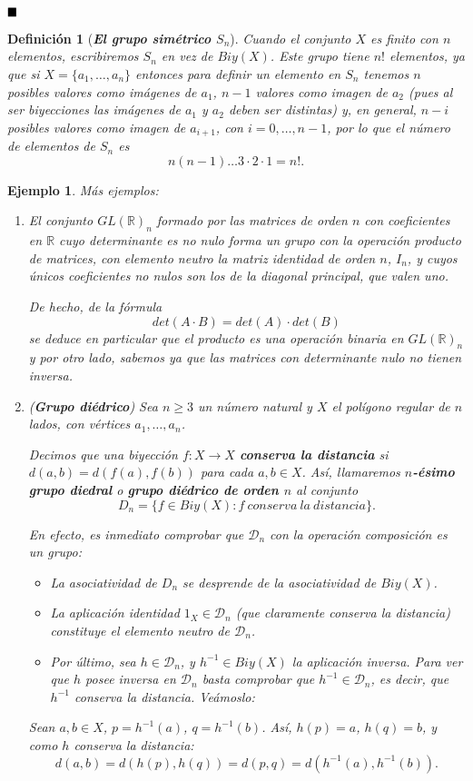 \documentclass[12pt]{article}
\newtheorem{definition}[theorem]{Definición}
\newtheorem{example}{Ejemplo}[theorem]
\begin{document}
$\hfill \blacksquare$

\begin{definition}[\textbf{\textit{El grupo simétrico $S_n$}}] 
Cuando el conjunto $X$ es finito con $n$ elementos, escribiremos $S_n$ en vez de $Biy(X)$. Este grupo tiene $n!$ elementos, ya que si $X = \lbrace a_1, \ldots, a_n \rbrace$ entonces para definir un elemento en $S_n$ tenemos $n$ posibles valores como imágenes de $a_1$, $n-1$ valores como imagen de $a_2$ (pues al ser biyecciones las imágenes de $a_1$ y $a_2$ deben ser distintas) y, en general, $n-i$ posibles valores como imagen de $a_{i+1}$, con $i = 0, \ldots, n-1$, por lo que el número de elementos de $S_n$ es $$n(n-1) \ldots 3 \cdot 2 \cdot 1 = n!.$$
\end{definition}

\begin{example}\label{ex:gDie} Más ejemplos: 
\begin{enumerate}
\item El conjunto $GL(\mathbb{R})_n$ formado por las matrices de orden $n$ con coeficientes en $\mathbb{R}$ cuyo determinante es no nulo forma un grupo con la operación producto de matrices, con elemento neutro la matriz identidad de orden $n$, $I_n$, y cuyos únicos coeficientes no nulos son los de la diagonal principal, que valen uno.

De hecho, de la fórmula $$det (A \cdot B) = det(A) \cdot det(B)$$ se deduce en particular que el producto es una operación binaria en $GL(\mathbb{R})_n$ y por otro lado, sabemos ya que las matrices con determinante nulo no tienen inversa.

\item (\textbf{\textit{Grupo diédrico}}) Sea $n\geq 3$ un número natural y $X$ el polígono regular de $n$ lados, con vértices $a_1, \ldots, a_n$.

Decimos que una biyección $f \colon X \longrightarrow X$ \textbf{conserva la distancia} si $d(a,b) = d(f(a), f(b))$ para cada $a,b \in X$. Así, llamaremos \textbf{$n$-ésimo grupo diedral} o \textbf{grupo diédrico de orden $n$} al conjunto $$D_n = \lbrace f \in Biy(X) : f~conserva~la~distancia \rbrace.$$

En efecto, es inmediato comprobar que $\mathcal{D}_{n}$ con la operación composición es un grupo: 
\begin{itemize}
\item La asociatividad de $D_n$ se desprende de la asociatividad de $Biy(X)$.
\item La aplicación identidad $1_{X}\in \mathcal{D}_{n}$ (que claramente conserva la distancia) constituye el elemento neutro de $\mathcal{D}_{n}$.
\item Por último, sea $h \in \mathcal{D}_{n}$, y $h^{-1} \in Biy(X)$ la aplicación inversa. Para ver que $h$ posee inversa en $\mathcal{D}_{n}$ basta comprobar que $h^{-1} \in \mathcal{D}_{n}$, es decir, que $h^{-1}$ conserva la distancia. Veámoslo:
\end{itemize}
Sean $a,b \in X$, $p = h^{-1}(a)$, $q = h^{-1}(b)$. Así, $h(p) = a$, $h(q) = b$, y como $h$ conserva la distancia: $$d(a,b) = d(h(p), h(q)) = d(p,q) = d(h^{-1}(a), h^{-1}(b)).$$


\end{enumerate}
\end{example}
\end{document}
